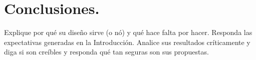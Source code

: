 \documentclass[10pt]{article}
\begin{document}
\section{Conclusiones.}

Explique por qué su diseño sirve (o nó) y qué hace falta por hacer.
Responda las expectativas generadas en la Introducción.
Analice sus resultados críticamente y diga si son creíbles y responda qué tan seguras son sus propuestas. 



 
 
\end{document}
